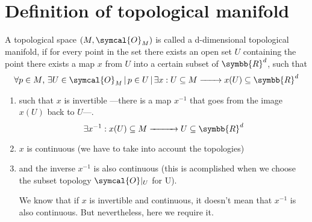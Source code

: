 \section{Definition of topological manifold}
A topological space $(M,\symcal{O}_M)$ is called a d-dimensional topological manifold,
if for every point in the set there exists an open set $U$ containing the point
there exists a map $x$ from $U$ into a certain subset of $\symbb{R}^d$, such that
\[
  \forall p\in M
  \text{, }\exists U\in\symcal{O}_M
  \,|\, p\in U
  \,|\, \exists x: U\subseteq M \xrightarrow{\hspace{2.0em}} x(U)\subseteq \symbb{R}^d 
\]
\begin{enumerate}
\item such that $x$ is invertible ---there is a map $x^{-1}$ that goes from the image $x(U)$
  back to $U$---.
  \[
    \exists x^{-1} : x(U)\subseteq M \xrightarrow{\hspace{2,8em}} U \subseteq \symbb{R}^d
  \]
\item $x$ is continuous (we have to take into account the topologies)
   \vspace{-1.0ex}
 \begin{center}
   \def\scl{1}
 \end{center}
\item and the inverse $x^{-1}$ is also continuous (this is acomplished when we choose
  the subset topology $\symcal{O}|_U$ for U).
  
  We know that if $x$ is invertible and continuous, it doesn't mean that $x^{-1}$ is also
  continuous. But nevertheless, here we require it.
  
\end{enumerate}

